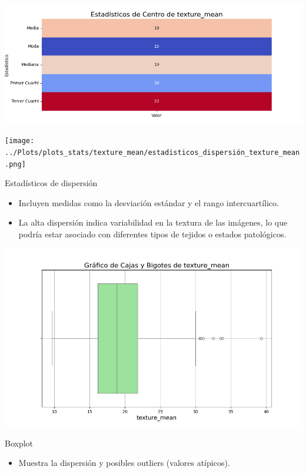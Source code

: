\documentclass[a4paper, 12pt]{article}
\begin{document}
\includegraphics[width=\textwidth]{../Plots/plots_stats/texture_mean/estadisticas_centro_texture_mean.png}

\texttt{[image: ../Plots/plots\_stats/texture\_mean/estadisticos\_dispersión\_texture\_mean.png]}

Estadísticos de dispersión

\begin{itemize}
\item Incluyen medidas como la desviación estándar y el rango intercuartílico.
\item La alta dispersión indica variabilidad en la textura de las imágenes, lo que podría estar asociado con diferentes tipos de tejidos o estados patológicos.
\end{itemize}

\includegraphics[width=\textwidth]{../Plots/plots_stats/texture_mean/boxplot_texture_mean.png}

Boxplot

\begin{itemize}
\item Muestra la dispersión y posibles outliers (valores atípicos).
\end{itemize}
\end{document}
